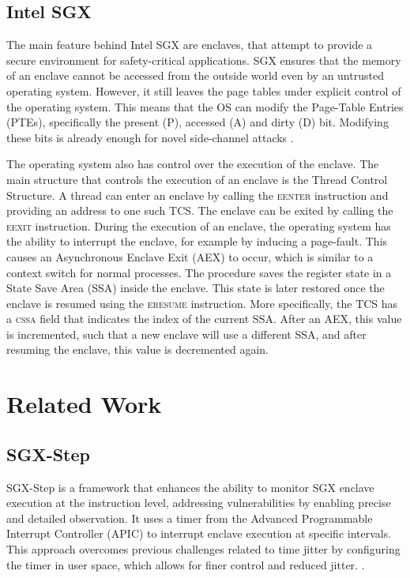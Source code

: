 \documentclass{llncs}
\begin{document}
\subsection{Intel SGX}

The main feature behind Intel SGX are enclaves,
that attempt to provide a secure environment for safety-critical applications.
SGX ensures that the memory of an enclave cannot be accessed from the outside world
even by an untrusted operating system.
However, it still leaves the page tables under explicit control of the operating system.
This means that the OS can modify the Page-Table Entries (PTEs),
specifically the present (P), accessed (A) and dirty (D) bit.
Modifying these bits is already enough for novel side-channel attacks \cite{XuCP15,BulckWKPS17}.

The operating system also has control over the execution of the enclave.
The main structure that controls the execution of an enclave is the Thread Control Structure.
A thread can enter an enclave by calling the \textsc{eenter} instruction and providing an address to one such TCS.
The enclave can be exited by calling the \textsc{eexit} instruction.
During the execution of an enclave,
the operating system has the ability to interrupt the enclave,
for example by inducing a page-fault.
This causes an Asynchronous Enclave Exit (AEX) to occur,
which is similar to a context switch for normal processes.
The procedure saves the register state in a State Save Area (SSA) inside the enclave.
This state is later restored once the enclave is resumed using the \textsc{eresume} instruction.
More specifically, the TCS has a \textsc{cssa} field that indicates the index of the current SSA.
After an AEX, this value is incremented, such that a new enclave will use a different SSA,
and after resuming the enclave, this value is decremented again.

\section{Related Work}

\subsection{SGX-Step}

SGX-Step \cite{BulckPS17} is a framework that enhances the ability to
monitor SGX enclave execution at the instruction level,
addressing vulnerabilities by enabling precise and detailed observation.
It uses a timer from the Advanced Programmable Interrupt Controller (APIC) to interrupt enclave execution at specific intervals. This approach overcomes previous challenges related to time jitter by configuring the timer in user space, which allows for finer control and reduced jitter. \cite{ArnautovTGKMPLM16}.
\end{document}
